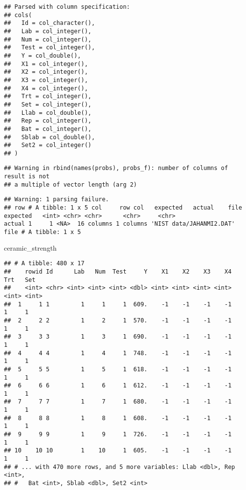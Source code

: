 \documentclass[]{book}
\newenvironment{Shaded}{\begin{snugshade}}{\end{snugshade}}
\newcommand{\NormalTok}[1]{#1}
\theoremstyle{definition}
\theoremstyle{definition}
\theoremstyle{definition}
\theoremstyle{remark}
\begin{document}
\begin{verbatim}
## Parsed with column specification:
## cols(
##   Id = col_character(),
##   Lab = col_integer(),
##   Num = col_integer(),
##   Test = col_integer(),
##   Y = col_double(),
##   X1 = col_integer(),
##   X2 = col_integer(),
##   X3 = col_integer(),
##   X4 = col_integer(),
##   Trt = col_integer(),
##   Set = col_integer(),
##   Llab = col_double(),
##   Rep = col_integer(),
##   Bat = col_integer(),
##   Sblab = col_double(),
##   Set2 = col_integer()
## )
\end{verbatim}

\begin{verbatim}
## Warning in rbind(names(probs), probs_f): number of columns of result is not
## a multiple of vector length (arg 2)
\end{verbatim}

\begin{verbatim}
## Warning: 1 parsing failure.
## row # A tibble: 1 x 5 col     row col   expected   actual    file                     expected   <int> <chr> <chr>      <chr>     <chr>                    actual 1     1 <NA>  16 columns 1 columns 'NIST data/JAHANMI2.DAT' file # A tibble: 1 x 5
\end{verbatim}

\begin{Shaded}
\begin{Highlighting}[]
\NormalTok{ceramic_strength}
\end{Highlighting}
\end{Shaded}

\begin{verbatim}
## # A tibble: 480 x 17
##    rowid Id      Lab   Num  Test     Y    X1    X2    X3    X4   Trt   Set
##    <int> <chr> <int> <int> <int> <dbl> <int> <int> <int> <int> <int> <int>
##  1     1 1         1     1     1  609.    -1    -1    -1    -1     1     1
##  2     2 2         1     2     1  570.    -1    -1    -1    -1     1     1
##  3     3 3         1     3     1  690.    -1    -1    -1    -1     1     1
##  4     4 4         1     4     1  748.    -1    -1    -1    -1     1     1
##  5     5 5         1     5     1  618.    -1    -1    -1    -1     1     1
##  6     6 6         1     6     1  612.    -1    -1    -1    -1     1     1
##  7     7 7         1     7     1  680.    -1    -1    -1    -1     1     1
##  8     8 8         1     8     1  608.    -1    -1    -1    -1     1     1
##  9     9 9         1     9     1  726.    -1    -1    -1    -1     1     1
## 10    10 10        1    10     1  605.    -1    -1    -1    -1     1     1
## # ... with 470 more rows, and 5 more variables: Llab <dbl>, Rep <int>,
## #   Bat <int>, Sblab <dbl>, Set2 <int>
\end{verbatim}
\end{document}
